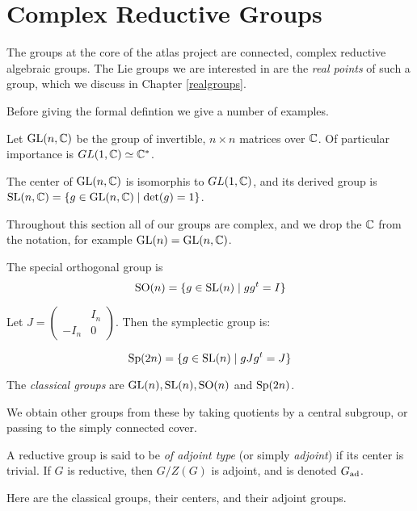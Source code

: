 \chapter{Complex Reductive Groups}  
\label{complexgroups}

The groups at the core of the atlas project are connected, complex
reductive algebraic groups. The Lie groups we are interested in are
the {\it real points} of such a group, which we discuss in Chapter
\ref{realgroups}.

Before giving the formal defintion we give a number of examples.

\begin{example}
Let $\text{GL}(n,\mathbb C)$ be the group of invertible, $n\times n$ matrices over $\mathbb C$.
Of particular importance is $GL(1,\mathbb C)\simeq \mathbb C^*$.

The center of $\text{GL}(n,\mathbb C)$ is isomorphis to $GL(1,\mathbb C)$, and its derived group is $\text{SL}(n,\mathbb C)=\{g\in \text{GL}(n,\mathbb C)\mid \det(g)=1\}$.

\end{example}

Throughout this section all of our groups are complex, and we drop the
$\mathbb C$ from the notation, for example $\text{GL}(n)=\text{GL}(n,\mathbb C)$. 

\begin{example}

The special orthogonal group is
$$
\text{SO}(n)=\{g\in \text{SL}(n)\mid gg^t=I\}
$$

Let $J=
\begin{pmatrix}
  &I_n\\-I_n&0
\end{pmatrix}$. Then the symplectic group is:

$$
\text{Sp}(2n)=\{g\in \text{SL}(n)\mid gJg^t=J\}
$$
\end{example}

The {\it classical groups} are $\text{GL}(n), \text{SL}(n), \text{SO}(n)$ and $\text{Sp}(2n)$.

We obtain other groups from these by taking quotients by a central
subgroup, or passing to the simply connected cover.

A reductive group is said to be {\it of adjoint type} (or simply {\it
  adjoint}) if its center is trivial. If $G$ is reductive, then
$G/Z(G)$ is adjoint, and is denoted $G_{\text{ad}}$.

Here are the classical groups, their centers, and their adjoint groups.

\bigskip

